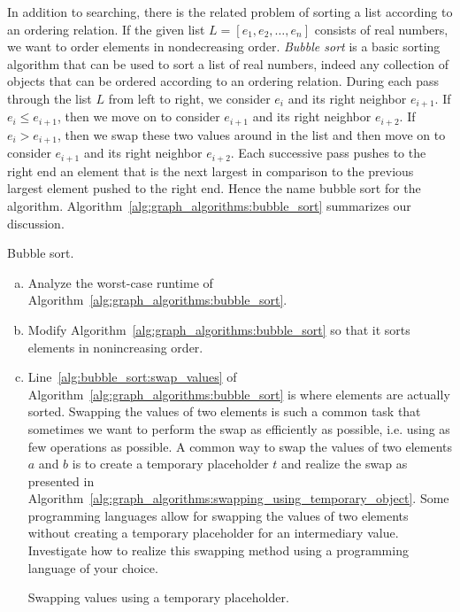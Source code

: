 \begin{problem}
\item In addition to searching, there is the related problem of
  sorting a list according to an ordering relation. If the given list
  $L = [e_1, e_2, \dots, e_n]$ consists of real numbers, we want to
  order elements in nondecreasing order.
  \emph{Bubble sort} is a basic sorting algorithm
  that can be used to sort a list of real numbers, indeed any
  collection of objects that can be ordered according to an ordering
  relation. During each pass through the list $L$ from left to right,
  we consider $e_i$ and its right neighbor $e_{i+1}$. If
  $e_i \leq e_{i+1}$, then we move on to consider $e_{i+1}$ and its
  right neighbor $e_{i+2}$. If $e_i > e_{i+1}$, then we swap these two
  values around in the list and then move on to consider $e_{i+1}$ and
  its right neighbor $e_{i+2}$. Each successive pass pushes to the
  right end an element that is the next largest in comparison to the
  previous largest element pushed to the right end. Hence the name
  bubble sort for the algorithm.
  Algorithm~\ref{alg:graph_algorithms:bubble_sort} summarizes our
  discussion.
  \begin{algorithm}[!htbp]
    
    \caption{Bubble sort.}
    \label{alg:graph_algorithms:bubble_sort}
  \end{algorithm}
  \begin{enumerate}[(a)]
  \item Analyze the worst-case runtime of
    Algorithm~\ref{alg:graph_algorithms:bubble_sort}.

  \item Modify Algorithm~\ref{alg:graph_algorithms:bubble_sort} so
    that it sorts elements in nonincreasing order.

  \item Line~\ref{alg:bubble_sort:swap_values} of
    Algorithm~\ref{alg:graph_algorithms:bubble_sort} is where elements
    are actually sorted. Swapping the values of two elements is such a
    common task that sometimes we want to perform the swap as
    efficiently as possible, i.e. using as few operations as
    possible. A common way to swap the values of two elements $a$ and
    $b$ is to create a temporary placeholder $t$ and realize the swap
    as presented in
    Algorithm~\ref{alg:graph_algorithms:swapping_using_temporary_object}.
    Some programming languages allow for swapping the values of two
    elements without creating a temporary placeholder for an
    intermediary value. Investigate how to realize this swapping
    method using a programming language of your choice.
    \begin{algorithm}[!htbp]
      
      \caption{Swapping values using a temporary placeholder.}
      \label{alg:graph_algorithms:swapping_using_temporary_object}
    \end{algorithm}
  \end{enumerate}


\end{problem}
